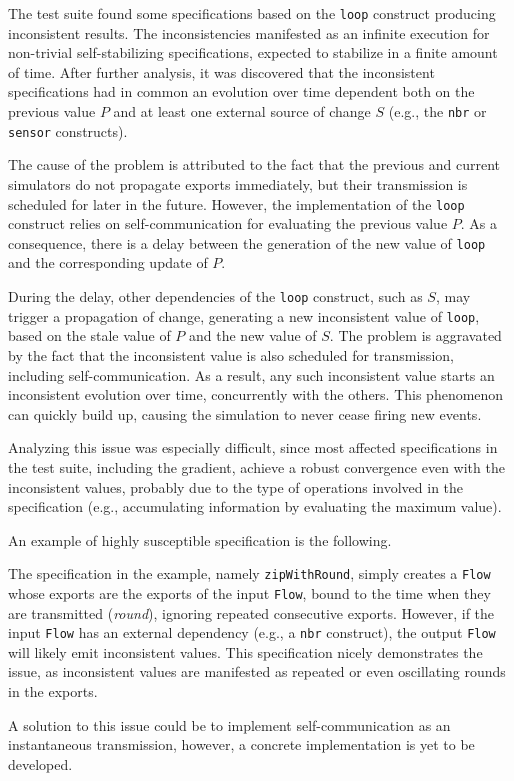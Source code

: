 The test suite found some specifications based on the \texttt{loop} construct
producing inconsistent results. The inconsistencies manifested as an infinite
execution for non-trivial self-stabilizing specifications, expected to
stabilize in a finite amount of time. After further analysis, it was discovered
that the inconsistent specifications had in common an evolution over time
dependent both on the previous value $P$ and at least one external source of
change $S$ (e.g., the \texttt{nbr} or \texttt{sensor} constructs).

The cause of the problem is attributed to the fact that the previous and
current simulators do not propagate exports immediately, but their transmission
is scheduled for later in the future. However, the implementation of the
\texttt{loop} construct relies on self-communication for evaluating the
previous value $P$. As a consequence, there is a delay between the generation
of the new value of \texttt{loop} and the corresponding update of $P$.

During the delay, other dependencies of the \texttt{loop} construct, such as
$S$, may trigger a propagation of change, generating a new inconsistent value
of \texttt{loop}, based on the stale value of $P$ and the new value of $S$. The
problem is aggravated by the fact that the inconsistent value is also scheduled
for transmission, including self-communication. As a result, any such
inconsistent value starts an inconsistent evolution over time, concurrently
with the others. This phenomenon can quickly build up, causing the simulation
to never cease firing new events.

Analyzing this issue was especially difficult, since most affected
specifications in the test suite, including the gradient, achieve a robust
convergence even with the inconsistent values, probably due to the type of
operations involved in the specification (e.g., accumulating information by
evaluating the maximum value).

An example of highly susceptible specification is the following.



The specification in the example, namely \texttt{zipWithRound}, simply creates
a \texttt{Flow} whose exports are the exports of the input \texttt{Flow}, bound
to the time when they are transmitted (\textit{round}), ignoring repeated
consecutive exports. However, if the input \texttt{Flow} has an external
dependency (e.g., a \texttt{nbr} construct), the output \texttt{Flow} will
likely emit inconsistent values. This specification nicely demonstrates the
issue, as inconsistent values are manifested as repeated or even oscillating
rounds in the exports.

A solution to this issue could be to implement self-communication as an
instantaneous transmission, however, a concrete implementation is yet to be
developed.
